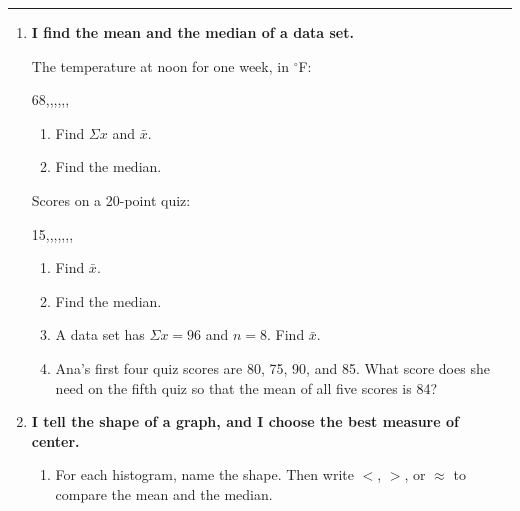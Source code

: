 \documentclass[11pt]{article}
\newcommand{\lessonhead}[1]{\par\vspace{0.6em}{\large\bfseries #1}\par\vspace{0.25em}\hrule\vspace{0.6em}}
\newcommand{\goal}[1]{\textbf{#1}\par\vspace{0.35em}}
\begin{document}
\newpage
\lessonhead{1.2 - Mean, Median, and Shape}
\begin{enumerate}[resume]

\item \goal{I find the mean and the median of a data set.}
The temperature at noon for one week, in $^\circ$F:
\begin{center}68,,,,,,\end{center}
\begin{enumerate}
  \item Find $\Sigma x$ and $\bar{x}$.

  \work{4em}
  \item Find the median.

  \work{3em}
\end{enumerate}

\vspace{0.6em}
Scores on a 20-point quiz:
\begin{center}15,,,,,,,\end{center}
\begin{enumerate}[start=3]
  \item Find $\bar{x}$.

  \work{2.5em}
  \item Find the median.

  \work{2em}
  \item A data set has $\Sigma x = 96$ and $n = 8$. Find $\bar{x}$. 
  \work{1em}
  \item Ana's first four quiz scores are 80, 75, 90, and 85. What score does she need on the fifth quiz so that the mean of all five scores is 84?

  \work{4em}
\end{enumerate}

\newpage
\item \goal{I tell the shape of a graph, and I choose the best measure of center.}
\begin{center}\end{center}
\begin{enumerate}
  \item For each histogram, name the shape. Then write $<$, $>$, or $\approx$ to compare the mean and the median.


\end{enumerate}
\end{enumerate}
\end{document}
